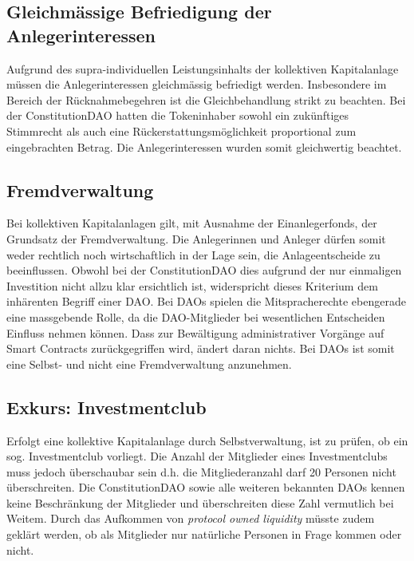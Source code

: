 \documentclass[a4paper,12pt]{report}
\begin{document}
	\subsection{Gleichmässige Befriedigung der Anlegerinteressen}
	\startsubsection
	
	Aufgrund des supra-individuellen Leistungsinhalts der kollektiven Kapitalanlage müssen die Anlegerinteressen gleichmässig befriedigt werden. Insbesondere im Bereich der Rücknahmebegehren ist die Gleichbehandlung strikt zu beachten. Bei der ConstitutionDAO hatten die Tokeninhaber sowohl ein zukünftiges Stimmrecht als auch eine Rückerstattungsmöglichkeit proportional zum eingebrachten Betrag. Die Anlegerinteressen wurden somit gleichwertig beachtet.
	
	\closesection	
	
	\subsection{Fremdverwaltung}
	\startsubsection
	Bei kollektiven Kapitalanlagen gilt, mit Ausnahme der Einanlegerfonds, der Grundsatz der Fremdverwaltung. Die Anlegerinnen und Anleger dürfen somit weder rechtlich noch wirtschaftlich in der Lage sein, die Anlageentscheide zu beeinflussen. Obwohl bei der ConstitutionDAO dies aufgrund der nur einmaligen Investition nicht allzu klar ersichtlich ist, widerspricht dieses Kriterium dem inhärenten Begriff einer DAO. Bei DAOs spielen die Mitspracherechte ebengerade eine massgebende Rolle, da die DAO-Mitglieder bei wesentlichen Entscheiden Einfluss nehmen können. Dass zur Bewältigung administrativer Vorgänge auf Smart Contracts zurückgegriffen wird, ändert daran nichts. Bei DAOs ist somit eine Selbst- und nicht eine Fremdverwaltung anzunehmen.
	\closesection

    \subsection{Exkurs: Investmentclub}
	\startsubsection
	Erfolgt eine kollektive Kapitalanlage durch Selbstverwaltung, ist zu prüfen, ob ein sog. Investmentclub vorliegt. Die Anzahl der Mitglieder eines Investmentclubs muss jedoch überschaubar sein d.h. die Mitgliederanzahl darf 20 Personen nicht überschreiten. Die ConstitutionDAO sowie alle weiteren bekannten DAOs kennen keine Beschränkung der Mitglieder und überschreiten diese Zahl vermutlich bei Weitem. Durch das Aufkommen von \textit{protocol owned liquidity} müsste zudem geklärt werden, ob als Mitglieder nur natürliche Personen in Frage kommen oder nicht.
	\closesection
	
\end{document}
